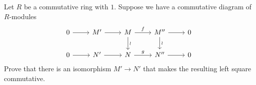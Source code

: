 \documentclass[10pt,oneside,openany]{memoir}
\begin{document}
\begin{exercise}
Let $R$ be a commutative ring with $1$. Suppose we have a commutative diagram
of $R$-modules
\[
\begin{tikzcd}
0 \arrow[r] & M' \arrow[r] & M \arrow[r, "f"] \arrow[d, "\wr"] &
M'' \arrow[r] \arrow[d, "\wr"] & 0 \\
0 \arrow[r] & N' \arrow[r] & N \arrow[r, "g"] & N'' \arrow[r] & 0
\end{tikzcd}
\]
Prove that there is an isomorphism $M'\longrightarrow N'$ that makes the
resulting left square commutative.
\end{exercise}
\end{document}
